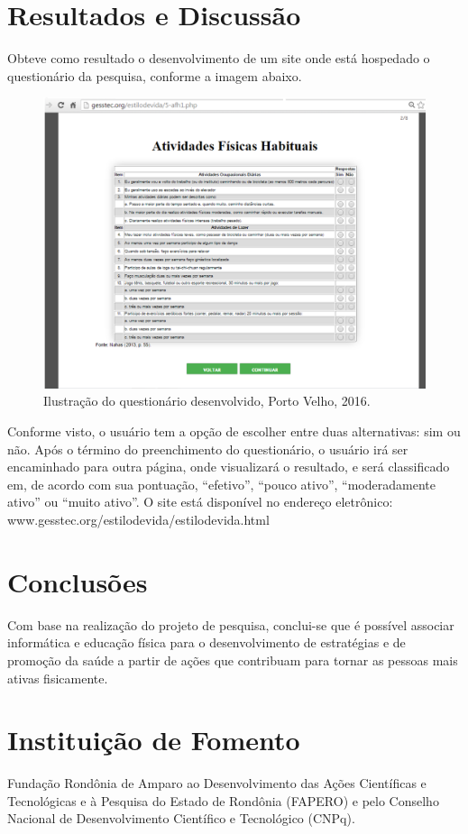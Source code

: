 \documentclass[article,12pt,onesidea,4paper,english,brazil,]{abntex2}
\begin{document}
	
	\section*{Resultados e Discussão}
	
	Obteve como resultado o desenvolvimento de um site onde está hospedado o questionário da pesquisa, conforme a imagem abaixo.
	
	\begin{figure}[h]
		\centering
		\includegraphics[width=0.7\linewidth]{pip04.png}
		\caption{Ilustração do questionário desenvolvido, Porto Velho, 2016.}
	\end{figure}
Conforme visto, o usuário tem a opção de escolher entre duas alternativas: sim ou não. Após o término do preenchimento do questionário, o usuário irá ser encaminhado para outra página, onde visualizará o resultado, e será classificado em, de acordo com sua pontuação, “efetivo”, “pouco ativo”, “moderadamente ativo” ou “muito ativo”.
O site está disponível no endereço eletrônico: www.gesstec.org/estilodevida/estilodevida.html
	
	\section*{Conclusões}
	
	Com base na realização do projeto de pesquisa, conclui-se que é possível associar informática e educação física para o desenvolvimento de estratégias e de promoção da saúde a partir de ações que contribuam para tornar as pessoas mais ativas fisicamente.
	
	\section*{Instituição de Fomento}
	
	Fundação Rondônia de Amparo ao Desenvolvimento das Ações Científicas e Tecnológicas e à Pesquisa do Estado de Rondônia (FAPERO) e pelo Conselho Nacional de Desenvolvimento Científico e Tecnológico (CNPq).
	
\end{document}
